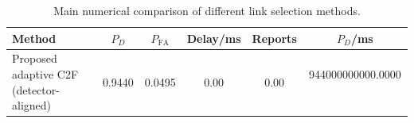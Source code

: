 \begin{table}[t]
    \centering
    \caption{Main numerical comparison of different link selection methods.}
    \label{tab:main_summary}
    \begin{tabular}{l c c c c c}
        \hline
        Method & $P_D$ & $P_{\mathrm{FA}}$ & Delay/ms & Reports & $P_D$/ms \\
        \hline
        Proposed adaptive C2F (detector-aligned) & 0.9440 & 0.0495 & 0.00 & 0.00 & 944000000000.0000 \
        \hline
    \end{tabular}
\end{table}
